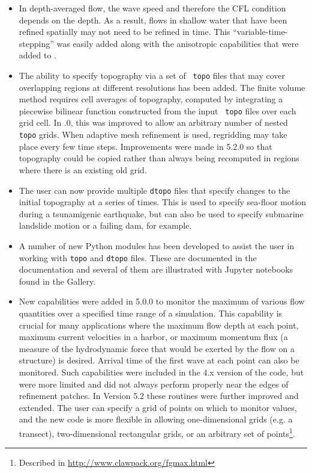 \begin{itemize}
\item In depth-averaged flow, the wave speed and therefore the CFL
condition depends on the depth.  As a result, flows in shallow water
that have been refined spatially may not need to be refined in time.
This ``variable-time-stepping'' was easily added along with the anisotropic
capabilities that were added to \amrclaw.
\item The ability to specify topography via a set of {\tt
topo} files that may cover overlapping regions at different resolutions has been added.
 The finite volume method requires cell averages of topography, computed by
integrating a piecewise bilinear function constructed from the input {\tt
topo} files over each grid cell.  In .0, this was improved to
allow an arbitrary number of nested {\tt topo} grids.
When adaptive mesh refinement is used,
regridding may take place every few time steps.  Improvements were made
in 5.2.0 so that topography could be copied rather than always being
recomputed in regions where there is an existing old grid.

\item The user can now provide multiple  {\tt dtopo} files that
specify changes to the
initial topography at a series of times.  This is used to specify sea-floor
motion during a tsunamigenic earthquake, but can also be used to specify
submarine landslide motion or a failing dam, for example.

\item A number of new Python modules has been developed to assist the user
in working with {\tt topo} and {\tt dtopo} files.  These are documented in
the \clawpack documentation and several of them are illustrated with Jupyter
notebooks found in the \clawpack Gallery.

\item New capabilities were added in 5.0.0 to monitor the maximum of
various flow quantities over a specified time range of a simulation.
This capability is crucial for many applications where the maximum
flow depth at each point, maximum current velocities in a harbor, or
maximum momentum flux (a measure of the hydrodynamic force that would
be exerted by the flow on a structure) is desired.  Arrival time of
the first wave at each point can also be monitored.  Such
capabilities were included in the 4.x version of the code, but were
more limited and did not always perform properly near the edges of
refinement patches.  In Version 5.2 these routines were further
improved and extended.  The user can specify a grid of points on which
to monitor values, and the new code is more flexible in allowing
one-dimensional grids (e.g. a transect), two-dimensional rectangular
grids, or an arbitrary set of points\footnote{Described in
\url{http://www.clawpack.org/fgmax.html}}.

\end{itemize}


